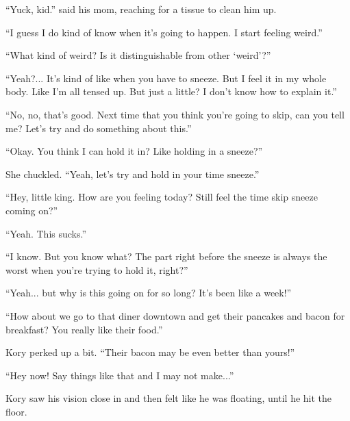 ``Yuck, kid.'' said his mom, reaching for a tissue to clean him up.

``I guess I do kind of know when it's going to happen. I start feeling weird.''

``What kind of weird? Is it distinguishable from other `weird'?''

``Yeah?... It's kind of like when you have to sneeze. But I feel it in my whole body. Like I'm all tensed up. But just a little? I don't know how to explain it.''

``No, no, that's good. Next time that you think you're going to skip, can you tell me? Let's try and do something about this.''

``Okay. You think I can hold it in? Like holding in a sneeze?''

She chuckled. ``Yeah, let's try and hold in your time sneeze.''

\line


``Hey, little king. How are you feeling today? Still feel the time skip sneeze coming on?''

``Yeah. This sucks.''

``I know. But you know what? The part right before the sneeze is always the worst when you're trying to hold it, right?''

``Yeah... but why is this going on for so long? It's been like a week!''

``How about we go to that diner downtown and get their pancakes and bacon for breakfast? You really like their food.''

Kory perked up a bit. ``Their bacon may be even better than yours!''

``Hey now! Say things like that and I may not make...''

Kory saw his vision close in and then felt like he was floating, until he hit the floor.
